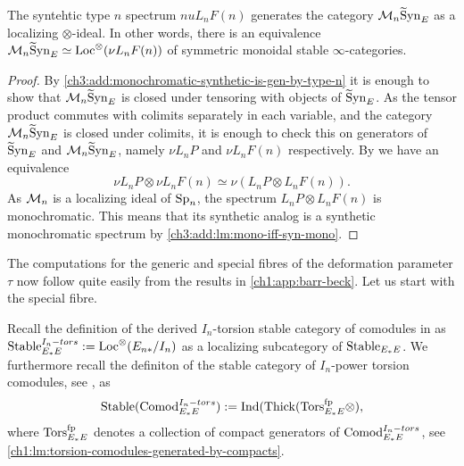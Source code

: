 \begin{lemma}
    The syntehtic type $n$ spectrum $nu L_n F(n)$ generates the category $\mathcal{M}_{n}\widetilde{\mathrm{S}}\mathrm{yn}_{E}$ as a localizing $\otimes$-ideal. In other words, there is an equivalence $\mathcal{M}_{n}\widetilde{\mathrm{S}}\mathrm{yn}_{E} \simeq \operatorname{Loc}^\otimes(\nu L_n F(n))$ of symmetric monoidal stable $\infty$-categories. 
\end{lemma}
\begin{proof}
    By \cref{ch3:add:monochromatic-synthetic-is-gen-by-type-n} it is enough to show that $\mathcal{M}_{n}\widetilde{\mathrm{S}}\mathrm{yn}_{E}$ is closed under tensoring with objects of $\widetilde{\mathrm{S}}\mathrm{yn}_{E}$. As the tensor product commutes with colimits separately in each variable, and the category $\mathcal{M}_{n}\widetilde{\mathrm{S}}\mathrm{yn}_{E}$ is closed under colimits, it is enough to check this on generators of $\widetilde{\mathrm{S}}\mathrm{yn}_{E}$ and $\mathcal{M}_{n}\widetilde{\mathrm{S}}\mathrm{yn}_{E}$, namely $\nu L_n P$ and $\nu L_n F(n)$ respectively. By \cite[4.24]{pstragowski_2022} we have an equivalence 
    \[\nu L_n P \otimes \nu L_n F(n) \simeq \nu(L_n P \otimes L_n F(n)).\]
    As $\mathcal{M}_{n}$ is a localizing ideal of $\mathrm{Sp}_n$, the spectrum $L_n P \otimes L_n F(n)$ is monochromatic. This means that its synthetic analog is a synthetic monochromatic spectrum by \cref{ch3:add:lm:mono-iff-syn-mono}. 
\end{proof}

The computations for the generic and special fibres of the deformation parameter $\tau$ now follow quite easily from the results in \cref{ch1:app:barr-beck}. Let us start with the special fibre. 

Recall the definition of the derived $I_n$-torsion stable category of comodules in \cite[2.4]{barthel-heard-valenzuela_2020} as $\mathrm{Stable}_{E_*E}^{I_n-tors} := \operatorname{Loc}^\otimes(E_{n*}/I_n)$ as a localizing subcategory of $\mathrm{Stable}_{E_*E}$. We furthermore recall the definiton of the stable category of $I_n$-power torsion comodules, see \cite[3.5]{barthel-heard-valenzuela_2020}, as 
\[\mathrm{Stable}(\mathrm{Comod}_{E_*E}^{I_n-tors}) := \operatorname{Ind}(\operatorname{Thick}(\mathrm{Tors}_{E_*E}^{\mathrm{fp}}\otimes),\]
where $\mathrm{Tors}_{E_*E}^{\mathrm{fp}}$ denotes a collection of compact generators of $\mathrm{Comod}_{E_*E}^{I_n-tors}$, see \cref{ch1:lm:torsion-comodules-generated-by-compacts}. 


